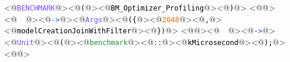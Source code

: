 <@\textcolor[HTML]{724BFF}{\texttt{BENCHMARK}}@><@\textcolor[HTML]{000000}{\texttt{(}}@><@\textcolor[HTML]{000000}{\texttt{BM\_Optimizer\_Profiling}}@><@\textcolor[HTML]{000000}{\texttt{)}}@>
<@\textcolor[HTML]{000000}{\texttt{}}@><@\textcolor[HTML]{000000}{\texttt{\ \ }}@><@\textcolor[HTML]{1041FF}{\texttt{->}}@><@\textcolor[HTML]{724BFF}{\texttt{Args}}@><@\textcolor[HTML]{000000}{\texttt{(\{}}@><@\textcolor[HTML]{DE6F10}{\texttt{2048}}@><@\textcolor[HTML]{000000}{\texttt{,}}@><@\textcolor[HTML]{000000}{\texttt{modelCreationJoinWithFilter}}@><@\textcolor[HTML]{000000}{\texttt{\})}}@>
<@\textcolor[HTML]{000000}{\texttt{}}@><@\textcolor[HTML]{000000}{\texttt{\ \ }}@><@\textcolor[HTML]{1041FF}{\texttt{->}}@><@\textcolor[HTML]{724BFF}{\texttt{Unit}}@><@\textcolor[HTML]{000000}{\texttt{(}}@><@\textcolor[HTML]{1F8F42}{\texttt{benchmark}}@><@\textcolor[HTML]{1041FF}{\texttt{::}}@><@\textcolor[HTML]{000000}{\texttt{kMicrosecond}}@><@\textcolor[HTML]{000000}{\texttt{);}}@>
<@\textcolor[HTML]{000000}{\texttt{}}@>